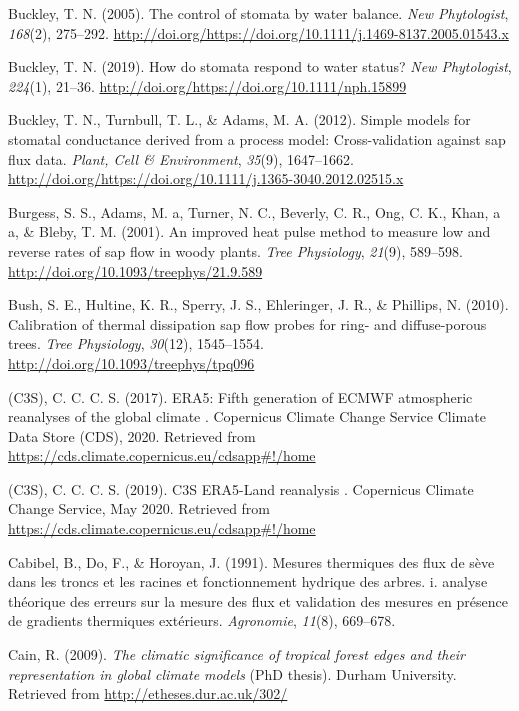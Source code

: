 \documentclass[11pt,twoside]{reedthesis}
\begin{document}
\hypertarget{ref-Buckley2005}{}
Buckley, T. N. (2005). The control of stomata by water balance.
\emph{New Phytologist}, \emph{168}(2), 275--292.
\url{http://doi.org/https://doi.org/10.1111/j.1469-8137.2005.01543.x}

\hypertarget{ref-Buckley2019}{}
Buckley, T. N. (2019). How do stomata respond to water status? \emph{New
Phytologist}, \emph{224}(1), 21--36.
\url{http://doi.org/https://doi.org/10.1111/nph.15899}

\hypertarget{ref-Buckley2012}{}
Buckley, T. N., Turnbull, T. L., \& Adams, M. A. (2012). Simple models
for stomatal conductance derived from a process model: Cross-validation
against sap flux data. \emph{Plant, Cell \& Environment}, \emph{35}(9),
1647--1662.
\url{http://doi.org/https://doi.org/10.1111/j.1365-3040.2012.02515.x}

\hypertarget{ref-Burgess2001}{}
Burgess, S. S., Adams, M. a, Turner, N. C., Beverly, C. R., Ong, C. K.,
Khan, a a, \& Bleby, T. M. (2001). An improved heat pulse method to
measure low and reverse rates of sap flow in woody plants. \emph{Tree
Physiology}, \emph{21}(9), 589--598.
\url{http://doi.org/10.1093/treephys/21.9.589}

\hypertarget{ref-Bush2010}{}
Bush, S. E., Hultine, K. R., Sperry, J. S., Ehleringer, J. R., \&
Phillips, N. (2010). Calibration of thermal dissipation sap flow probes
for ring- and diffuse-porous trees. \emph{Tree Physiology},
\emph{30}(12), 1545--1554. \url{http://doi.org/10.1093/treephys/tpq096}

\hypertarget{ref-copernicus_climate_change_service_c3s_era5_2017}{}
(C3S), C. C. C. S. (2017). ERA5: Fifth generation of ECMWF atmospheric
reanalyses of the global climate . Copernicus Climate Change Service
Climate Data Store (CDS), 2020. Retrieved from
\url{https://cds.climate.copernicus.eu/cdsapp\#!/home}

\hypertarget{ref-copernicus_climate_change_service_c3s_c3s_2019}{}
(C3S), C. C. C. S. (2019). C3S ERA5-Land reanalysis . Copernicus Climate
Change Service, May 2020. Retrieved from
\url{https://cds.climate.copernicus.eu/cdsapp\#!/home}

\hypertarget{ref-Cabibel1991}{}
Cabibel, B., Do, F., \& Horoyan, J. (1991). Mesures thermiques des flux
de sève dans les troncs et les racines et fonctionnement hydrique des
arbres. i. analyse théorique des erreurs sur la mesure des flux et
validation des mesures en présence de gradients thermiques extérieurs.
\emph{Agronomie}, \emph{11}(8), 669--678.

\hypertarget{ref-Cain2009}{}
Cain, R. (2009). \emph{The climatic significance of tropical forest
edges and their representation in global climate models} (PhD thesis).
Durham University. Retrieved from \url{http://etheses.dur.ac.uk/302/}
\end{document}
